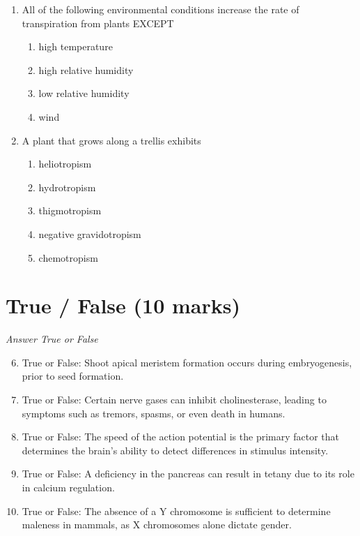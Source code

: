 \documentclass[12pt]{article}
\begin{document}
\begin{enumerate}[label=\arabic*.]
\begin{enumerate}[label=(\alph*)]
    \item Smallpox virus is confined to research laboratories
    \item There is no specific treatment for smallpox
\end{enumerate}
\item All of the following environmental conditions increase the rate of transpiration from
plants EXCEPT
\begin{enumerate}[label=(\alph*)]
    \item high temperature
    \item high relative humidity
    \item low relative humidity
    \item wind
\end{enumerate}
\item A plant that grows along a trellis exhibits
\begin{enumerate}[label=(\alph*)]
    \item heliotropism
    \item hydrotropism
    \item thigmotropism
    \item negative gravidotropism
    \item chemotropism
\end{enumerate}
\end{enumerate}

\section*{True / False (10 marks)}
\textit{Answer True or False}
\begin{enumerate}[label=\arabic*.]
\setcounter{enumi}{5}
\item True or False: Shoot apical meristem formation occurs during embryogenesis, prior to seed formation.
\item True or False: Certain nerve gases can inhibit cholinesterase, leading to symptoms such as tremors, spasms, or even death in humans.
\item True or False: The speed of the action potential is the primary factor that determines the brain's ability to detect differences in stimulus intensity.
\item True or False: A deficiency in the pancreas can result in tetany due to its role in calcium regulation.
\item True or False: The absence of a Y chromosome is sufficient to determine maleness in mammals, as X chromosomes alone dictate gender.
\end{enumerate}
\end{document}
